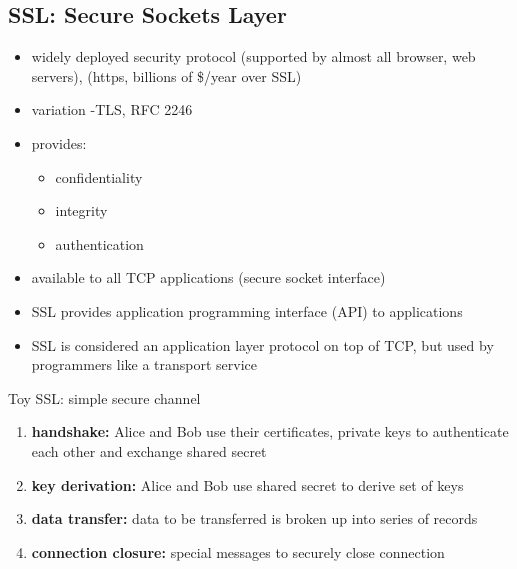 \subsection{SSL: Secure Sockets Layer}
\begin{itemize}
	\item widely deployed security protocol (supported by almost all browser, web servers), (https, billions of \$/year over SSL)
	\item variation -TLS, RFC 2246
	\item provides:
	\begin{itemize}
		\item confidentiality
		\item integrity
		\item authentication
	\end{itemize}
	\item available to all TCP applications (secure socket interface)
	\item SSL provides application programming interface (API) to applications
	\item SSL is considered an application layer protocol on top of TCP, but used by programmers like a transport service
\end{itemize}
\begin{note}{Toy SSL: simple secure channel}
	\begin{enumerate}
		\item \textbf{handshake:} Alice and Bob use their certificates, private keys to authenticate each other and exchange shared secret
		\item \textbf{key derivation:} Alice and Bob use shared secret to derive set of keys
		\item \textbf{data transfer:} data to be transferred is broken up into series of records
		\item \textbf{connection closure:} special messages to securely close connection
	\end{enumerate}
\end{note}
